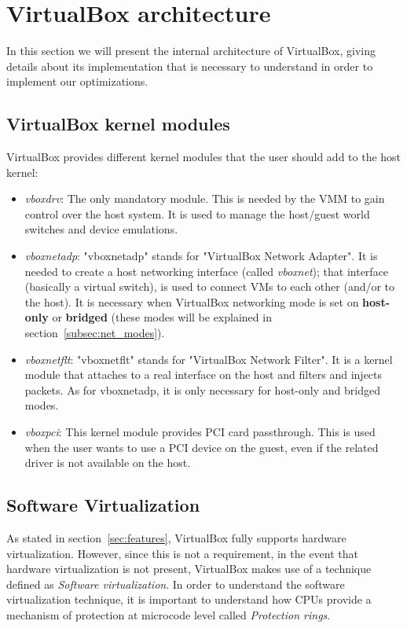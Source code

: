 \documentclass[a4paper, 12pt, titlepage]{report}
\begin{document}
\section{VirtualBox architecture} \label{sec:architecture}
In this section we will present the internal architecture of VirtualBox, giving details about its implementation that is necessary to understand in order to implement our optimizations.
\subsection{VirtualBox kernel modules}
VirtualBox provides different kernel modules that the user should add to the host kernel:
\begin{itemize}
\item \textit{vboxdrv}: The only mandatory module. This is needed by the VMM to gain control over the host system. It is used to manage the host/guest world switches and device emulations.
\item \textit{vboxnetadp}: "vboxnetadp" stands for "VirtualBox Network Adapter". It is needed to create a host networking interface (called \textit{vboxnet}); that interface (basically a virtual switch), is used to connect VMs to each other (and/or to the host). It is necessary when VirtualBox networking mode is set on \textbf{host-only} or \textbf{bridged} (these modes will be explained in section~\ref{subsec:net_modes}).
\item \textit{vboxnetflt}: "vboxnetflt" stands for "VirtualBox Network Filter". It is a kernel module that attaches to a real interface on the host and filters and injects packets. As for vboxnetadp, it is only necessary for host-only and bridged modes.
\item \textit{vboxpci}: This kernel module provides PCI card passthrough. This is used when the user wants to use a PCI device on the guest, even if the related driver is not available on the host.
\end{itemize}
\subsection{Software Virtualization}
As stated in section~\ref{sec:features}, VirtualBox fully supports hardware virtualization. However, since this is not a requirement, in the event that hardware virtualization is not present, VirtualBox makes use of a technique defined as \textit{Software virtualization}.
In order to understand the software virtualization technique, it is important to understand how CPUs provide a mechanism of protection at microcode level called \textit{Protection rings}.
\end{document}
